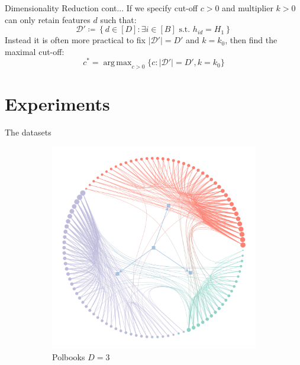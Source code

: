 \documentclass{beamer}
\newcommand{\Dcal}{\mathcal{D}}
\DeclareMathOperator*{\argmax}{arg\,max} %
\begin{document}
	\begin{frame}{Dimensionality Reduction cont...}
		If we specify cut-off $c>0$ and multiplier $k>0$ can only retain features $d$ such that:
		$$\Dcal' \coloneqq \left\{ d \in [D] : \exists i \in [B] \textrm{ s.t. } h_{id} = H_1\right\}$$
		Instead it is often more practical to fix $|\Dcal'| = D'$ and $k=k_0$, then find the maximal cut-off:
		$$c^* = \argmax_{c>0}\{c: |\Dcal'|=D', k=k_0\}$$
	\end{frame}

\section{Experiments}

	\begin{frame}{The datasets}
		\begin{figure}[!h]
			\centering
			\begin{subfigure}[t]{0.3\linewidth}
				\centering
				\includegraphics[width=\linewidth]{polbooks-graph.png}
				\caption{Polbooks $D=3$}
				\label{fig:polbooks-graph}
			\end{subfigure}
			\hfill
			\begin{subfigure}[t]{0.3\linewidth}
				\centering

\end{subfigure}
\end{figure}
\end{frame}
\end{document}
